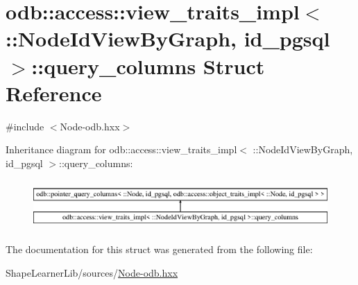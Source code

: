 \hypertarget{structodb_1_1access_1_1view__traits__impl_3_01_1_1_node_id_view_by_graph_00_01id__pgsql_01_4_1_1query__columns}{}\section{odb\+:\+:access\+:\+:view\+\_\+traits\+\_\+impl$<$ \+:\+:Node\+Id\+View\+By\+Graph, id\+\_\+pgsql $>$\+:\+:query\+\_\+columns Struct Reference}
\label{structodb_1_1access_1_1view__traits__impl_3_01_1_1_node_id_view_by_graph_00_01id__pgsql_01_4_1_1query__columns}


{\ttfamily \#include $<$Node-\/odb.\+hxx$>$}

Inheritance diagram for odb\+:\+:access\+:\+:view\+\_\+traits\+\_\+impl$<$ \+:\+:Node\+Id\+View\+By\+Graph, id\+\_\+pgsql $>$\+:\+:query\+\_\+columns\+:\begin{figure}[H]
\begin{center}
\leavevmode
\includegraphics[height=1.908007cm]{d4/d78/structodb_1_1access_1_1view__traits__impl_3_01_1_1_node_id_view_by_graph_00_01id__pgsql_01_4_1_1query__columns}
\end{center}
\end{figure}


The documentation for this struct was generated from the following file\+:\begin{DoxyCompactItemize}
\item 
Shape\+Learner\+Lib/sources/\hyperlink{_node-odb_8hxx}{Node-\/odb.\+hxx}\end{DoxyCompactItemize}
